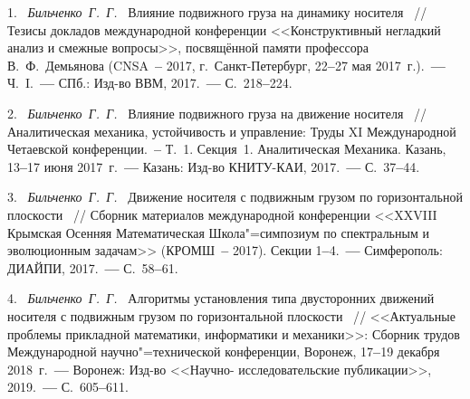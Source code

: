 \litlist



1.~%
\textit%
{Бильченко~Г.~Г.~}
{%
  {Влияние подвижного груза
 на динамику носителя}%
~/$\!$/
  Тезисы докладов международной конференции
  <<Конструктивный негладкий анализ
  и смежные вопросы>>,
  посвящённой памяти профессора
  В.~Ф.~Демьянова
  (CNSA~{\textbf{--}} 2017,
  г.~Санкт-Петербург,
  22{\textbf{--}}27
  мая 2017~г.).~{\textbf{---}}
  Ч.~I.~{\textbf{---}}
  СПб.: Изд-во ВВМ,
  2017.~{\textbf{---}}
  С.~218{\textbf{--}}224.%
  }



2.~%
\textit%
{Бильченко~Г.~Г.~}
{%
  {Влияние подвижного груза
  на движение носителя}%
~/$\!$/
  Аналитическая механика,
  устойчивость и управление:
  Труды XI Международной
  Четаевской конференции.~{\textbf{--}}
  Т.~1.
  Секция~1.
  Аналитическая Механика.
  Казань,
  13{\textbf{--}}17
  июня 2017~г.~{\textbf{---}}
  Казань: Изд-во КНИТУ-КАИ,
  2017.~{\textbf{---}}
  С.~37{\textbf{--}}44.%
  }



3.~%
\textit%
{Бильченко~Г.~Г.~}
{%
  {Движение носителя с подвижным грузом
  по горизонтальной плоскости}%
~/$\!$/
  Сборник материалов международной конференции
  <<XXVIII Крымская Осенняя
  Математическая Школа"=симпозиум
  по спектральным и эволюционным задачам>>
  (КРОМШ~{\textbf{--}} 2017).
  Секции
  1{\textbf{--}}4.~{\textbf{---}}
  Симферополь: ДИАЙПИ,
  2017.~{\textbf{---}}
  С.~58{\textbf{--}}61.%
  }



4.~%
\textit%
{Бильченко~Г.~Г.~}
{%
  {Алгоритмы
  установления типа
  двусторонних движений носителя
  с подвижным грузом
  по горизонтальной плоскости}%
~/$\!$/
  <<Актуальные проблемы
  прикладной математики, информатики
  и механики>>:
  Сборник трудов Международной
  научно"=технической конференции,
  Воронеж,
  17{\textbf{--}}19
  декабря 2018~г.~{\textbf{---}}
  Воронеж:
  Изд-во
  <<Научно-%
  ис\-сле\-до\-ва\-тель\-ские
  публикации>>,
  2019.~{\textbf{---}}
  С.~605{\textbf{--}}611.%
 }



